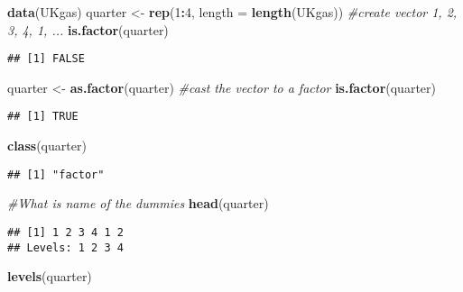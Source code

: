 \documentclass[]{book}
\newenvironment{Shaded}{\begin{snugshade}}{\end{snugshade}}
\newcommand{\CommentTok}[1]{\textcolor[rgb]{0.56,0.35,0.01}{\textit{#1}}}
\newcommand{\DataTypeTok}[1]{\textcolor[rgb]{0.13,0.29,0.53}{#1}}
\newcommand{\DecValTok}[1]{\textcolor[rgb]{0.00,0.00,0.81}{#1}}
\newcommand{\KeywordTok}[1]{\textcolor[rgb]{0.13,0.29,0.53}{\textbf{#1}}}
\newcommand{\NormalTok}[1]{#1}
\newcommand{\OperatorTok}[1]{\textcolor[rgb]{0.81,0.36,0.00}{\textbf{#1}}}
\newcommand{\StringTok}[1]{\textcolor[rgb]{0.31,0.60,0.02}{#1}}
\theoremstyle{definition}
\theoremstyle{definition}
\theoremstyle{definition}
\theoremstyle{remark}
\begin{document}
\begin{Shaded}
\begin{Highlighting}[]
\KeywordTok{data}\NormalTok{(UKgas)}
\NormalTok{quarter <-}\StringTok{ }\KeywordTok{rep}\NormalTok{(}\DecValTok{1}\OperatorTok{:}\DecValTok{4}\NormalTok{, }\DataTypeTok{length =} \KeywordTok{length}\NormalTok{(UKgas)) }\CommentTok{#create vector 1, 2, 3, 4, 1, ...}
\KeywordTok{is.factor}\NormalTok{(quarter)}
\end{Highlighting}
\end{Shaded}

\begin{verbatim}
## [1] FALSE
\end{verbatim}

\begin{Shaded}
\begin{Highlighting}[]
\NormalTok{quarter <-}\StringTok{ }\KeywordTok{as.factor}\NormalTok{(quarter) }\CommentTok{#cast the vector to a factor}
\KeywordTok{is.factor}\NormalTok{(quarter)}
\end{Highlighting}
\end{Shaded}

\begin{verbatim}
## [1] TRUE
\end{verbatim}

\begin{Shaded}
\begin{Highlighting}[]
\KeywordTok{class}\NormalTok{(quarter)}
\end{Highlighting}
\end{Shaded}

\begin{verbatim}
## [1] "factor"
\end{verbatim}

\begin{Shaded}
\begin{Highlighting}[]
\CommentTok{#What is name of the dummies}
\KeywordTok{head}\NormalTok{(quarter)}
\end{Highlighting}
\end{Shaded}

\begin{verbatim}
## [1] 1 2 3 4 1 2
## Levels: 1 2 3 4
\end{verbatim}

\begin{Shaded}
\begin{Highlighting}[]
\KeywordTok{levels}\NormalTok{(quarter)}
\end{Highlighting}
\end{Shaded}
\end{document}
